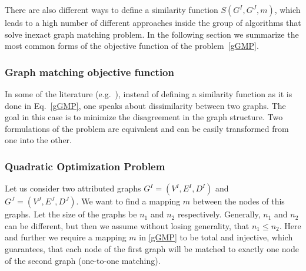 There are also different ways to define a similarity function $S(G^I,G^J,m)$, which leads to a high number of different approaches inside the group of algorithms that solve inexact graph matching problem. In the following section we summarize the most common forms of the objective function of the problem~\eqref{gGMP}.
\subsubsection*{Graph matching objective function}
In some of the literature (e.g.~\cite{Herault1990_SimulatedAnnealing,FastPFP,Lyzinski2015,Roth2001,Vogelstein_BrainGraphs,Zazlavskiy2008_PATH}), instead of defining a similarity function as it is done in Eq.~\eqref{gGMP}, one speaks about dissimilarity between two graphs. The goal in this case is to minimize the disagreement in the graph structure. Two formulations of the problem are equivalent and can be easily transformed from one into the other.
\subsubsection{Quadratic Optimization Problem}
Let us consider two attributed graphs $G^I = (V^I, E^I,D^I)$ and $G^J = (V^J, E^J,D^J)$. We want to find a mapping $m$ between the nodes of this graphs. Let the size of the graphs be $n_1$ and $n_2$ respectively. Generally, $n_1$ and $n_2$ can be different, but then we assume without losing generality, that $n_1\le n_2$. Here and further we require a mapping $m$ in \eqref{gGMP} to be total and injective, which guarantees, that each node of the first graph will be matched to exactly one node of the second graph (one-to-one matching). 

